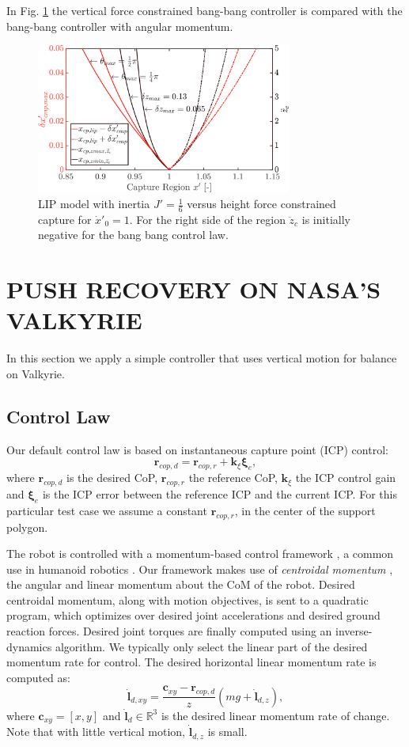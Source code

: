 \documentclass[letterpaper, 10 pt, conference]{ieeeconf}  %
\newcommand{\rcmpd}{\mathbf{r}_{cop,d}}
\newcommand{\rcmpr}{\mathbf{r}_{cop,r}}
\newcommand{\icpe}{\boldsymbol{\xi}_e}
\begin{document}
In Fig. \ref{fig:compare} the vertical force constrained bang-bang controller is compared with the bang-bang controller with angular momentum.

\begin{figure}[h]
      \centering
      \includegraphics[width=3.3in]{capcompare.png}
      \caption{LIP model with inertia $J'=\frac{1}{6}$ versus height force constrained capture for $\dot{x}'_0=1$. For the right side of the region $\ddot{z}_c$ is initially negative for the bang bang control law.}
      \label{fig:compare}
\end{figure}
\section{PUSH RECOVERY ON NASA'S VALKYRIE}\label{sec:valkyrie}
In this section we apply a simple controller that uses vertical motion for balance on Valkyrie. 
\subsection{Control Law}
Our default control law is based on instantaneous capture point (ICP) \cite{koolen2012capturability} control:
\begin{equation}
	\rcmpd = \rcmpr + \mathbf{k}_{\xi}\icpe,
\end{equation}
where $\rcmpd$ is the desired CoP, $\rcmpr$ the reference CoP, $\mathbf{k}_{\xi}$ the ICP control gain and $\icpe$ is the ICP error between the reference ICP and the current ICP. For this particular test case we assume a constant $\rcmpr$, in the center of the support polygon.

The robot is controlled with a momentum-based control framework \cite{koolen2016design}, a common use in humanoid robotics \cite{kajita2003resolved, lee2012momentum}. Our framework makes use of \textit{centroidal momentum} \cite{orin2013centroidal}, the angular and linear momentum about the CoM of the robot. Desired centroidal momentum, along with motion objectives, is sent to a quadratic program, which optimizes over desired joint accelerations and desired ground reaction forces. Desired joint torques are finally computed using an inverse-dynamics algorithm. We typically only select the linear part of the desired momentum rate for control. The desired horizontal linear momentum rate is computed as:
\begin{equation}
	\dot{\mathbf{l}}_{d,xy} = \frac{\mathbf{c}_{xy}-\rcmpd}{z}(mg + \dot{\mathbf{l}}_{d,z}),
\end{equation}
where $\mathbf{c}_{xy}=[x,y]$ and $\dot{\mathbf{l}}_{d} \in \mathbb{R}^3$ is the desired linear momentum rate of change. Note that with little vertical motion, $ \dot{\mathbf{l}}_{d,z}$ is small.
\end{document}
